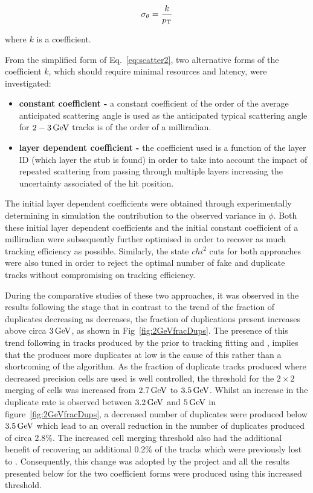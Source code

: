 \begin{equation}
\sigma_{\theta} = \frac{k}{p_{\mathrm{T}}}
\label{eq:scatter2}
\end{equation}

where $k$ is a coefficient.

From the simplified form of Eq.~\ref{eq:scatter2}, two alternative forms of the coefficient $k$, which should require minimal resources and latency, were investigated:

\begin{itemize}
\item \textbf{constant coefficient - } a constant coefficient of the order of the average anticipated scattering angle is used as the anticipated typical scattering angle for $2-3\,\text{Ge\hspace{-.08em}V}$ tracks is of the order of a milliradian.
\item \textbf{layer dependent coefficient -} the coefficient used is a function of the layer ID (\ie which layer the stub is found) in order to take into account the impact of repeated scattering from passing through multiple layers increasing the uncertainty associated of the hit position.
\end{itemize}

The initial layer dependent coefficients were obtained through experimentally determining in simulation the \MS contribution to the observed variance in $\phi$.
Both these initial layer dependent coefficients and the initial constant coefficient of a milliradian were subsequently further optimised in order to recover as much tracking efficiency as  possible.
Similarly, the \KF state $chi^{2}$ cuts for both approaches were also tuned in order to reject the optimal number of fake and duplicate tracks without compromising on tracking efficiency.

During the comparative studies of these two approaches, it was observed in the results following the \DR stage that in contrast to the trend of the fraction of duplicates decreasing as \pT decreases, the fraction of duplications present increases above circa $3\,\text{Ge\hspace{-.08em}V}$, as shown in Fig~\ref{fig:2GeVfracDups}.
The presence of this trend following in tracks produced by the \HT prior to tracking fitting and \DR, implies that the \HT produces more duplicates at low \pT is the cause of this rather than a shortcoming of the \DR algorithm.
As the fraction of duplicate tracks produced where decreased precision \HT cells are used is well controlled, the \pT threshold for the $2 \times 2$ merging of \HT cells was increased from $2.7\,\text{Ge\hspace{-.08em}V}$ to $3.5\,\text{Ge\hspace{-.08em}V}$.
Whilst an increase in the duplicate rate is observed between $3.2\,\text{Ge\hspace{-.08em}V}$ and $5\,\text{Ge\hspace{-.08em}V}$ in figure~\ref{fig:2GeVfracDups}, a decreased number of duplicates were produced below $3.5\,\text{Ge\hspace{-.08em}V}$ which lead to an overall reduction in the number of duplicates produced of circa 2.8\%.
The increased \HT cell merging threshold also had the additional benefit of recovering an additional 0.2\% of the tracks which were previously lost to \MS.
Consequently, this change was adopted by the project and all the results presented below for the two \MS coefficient forms were produced using this increased threshold. 

